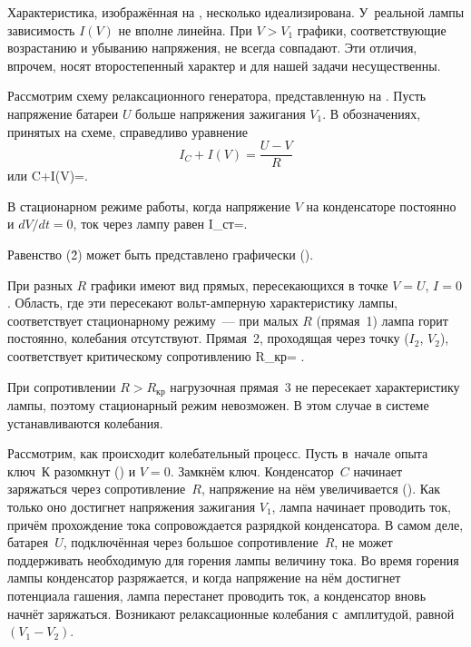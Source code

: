 Характеристика, изображённая на , несколько идеализирована. У~реальной лампы зависимость $I(V)$ не вполне линейна.
При $V>V_1$ графики, соответствующие возрастанию и убыванию напряжения, не всегда совпадают. Эти отличия, впрочем, носят
второстепенный характер и для нашей задачи несущественны.


Рассмотрим схему релаксационного генератора, представленную на . Пусть напряжение батареи $U$ больше напряжения
зажигания $V_1$. В обозначениях, принятых на схеме, справедливо уравнение
\[
I_C+I(V)=\frac{U-V}{R}
\]
или
C+I(V)=.
\ee

В стационарном режиме работы, когда напряжение $V$ на конденсаторе постоянно и $dV/dt = 0$, ток через лампу равен
I_{ст}=.
\ee

Равенство (\r2) может быть представлено графически ().

При разных $R$ графики имеют вид прямых, пересекающихся в точке $V=U$, $I=0$. Область, где эти 
пересекают вольт-амперную характеристику лампы, соответствует стационарному режиму~--- при малых $R$ (прямая~1) лампа
горит постоянно, колебания отсутствуют. Прямая~2, проходящая через точку ($I_2$, $V_2$), соответствует критическому
сопротивлению
R_{кр}= .
\ee

При сопротивлении $R>R_{кр}$ нагрузочная прямая~3 не пересекает характеристику лампы, поэтому стационарный режим
невозможен. В этом случае в системе устанавливаются колебания.

Рассмотрим, как происходит колебательный процесс. Пусть в~начале опыта ключ~К разомкнут () и $V=0$. Замкнём ключ.
Конденсатор~$C$ начинает заряжаться через сопротивление~$R$, напряжение на нём увеличивается (). Как только оно
достигнет напряжения зажигания $V_1$, лампа начинает проводить ток, причём прохождение тока сопровождается разрядкой
конденсатора. В самом деле, батарея~$U$, подключённая через большое сопротивление~$R$, не может поддерживать необходимую
для горения лампы величину тока. Во время горения лампы конденсатор разряжается, и когда напряжение на нём достигнет
потенциала гашения, лампа перестанет проводить ток, а конденсатор вновь начнёт заряжаться. Возникают релаксационные
колебания с~амплитудой, равной $(V_1-V_2)$.


